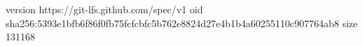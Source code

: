 version https://git-lfs.github.com/spec/v1
oid sha256:5393e1bfb6f86f0fb75fcfcbfc5b762e8824d27e4b1b4a60255110c907764ab8
size 131168
